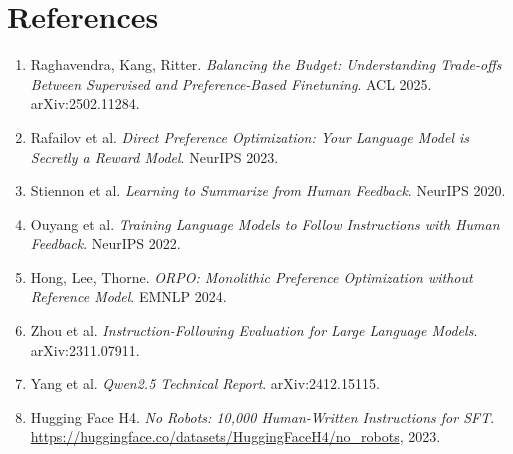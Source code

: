 \documentclass[11pt]{article}
\begin{document}
\section*{References}
\begin{enumerate}[leftmargin=1.4em, itemsep=0.1em]
\item Raghavendra, Kang, Ritter. \emph{Balancing the Budget: Understanding Trade-offs Between Supervised and Preference-Based Finetuning}. ACL 2025. arXiv:2502.11284.
\item Rafailov et al. \emph{Direct Preference Optimization: Your Language Model is Secretly a Reward Model}. NeurIPS 2023.
\item Stiennon et al. \emph{Learning to Summarize from Human Feedback}. NeurIPS 2020.
\item Ouyang et al. \emph{Training Language Models to Follow Instructions with Human Feedback}. NeurIPS 2022.
\item Hong, Lee, Thorne. \emph{ORPO: Monolithic Preference Optimization without Reference Model}. EMNLP 2024.
\item Zhou et al. \emph{Instruction-Following Evaluation for Large Language Models}. arXiv:2311.07911.
\item Yang et al. \emph{Qwen2.5 Technical Report}. arXiv:2412.15115.
\item Hugging Face H4. \emph{No Robots: 10{,}000 Human-Written Instructions for SFT}. \url{https://huggingface.co/datasets/HuggingFaceH4/no_robots}, 2023.
\end{enumerate}
\end{document}
